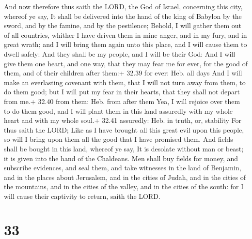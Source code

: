  And now therefore thus saith the LORD, the God of
Israel, concerning this city, whereof ye say, It shall be delivered into
the hand of the king of Babylon by the sword, and by the famine, and by
the pestilence;  Behold, I will gather them out of all
countries, whither I have driven them in mine anger, and in my fury, and
in great wrath; and I will bring them again unto this place, and I will
cause them to dwell safely:  And they shall be my people,
and I will be their God:  And I will give them one heart,
and one way, that they may fear me for ever, for the good of them, and
of their children after them:+ 32.39 for ever: Heb. all days
 And I will make an everlasting covenant with them, that I
will not turn away from them, to do them good; but I will put my fear in
their hearts, that they shall not depart from me.+ 32.40 from them: Heb.
from after them  Yea, I will rejoice over them to do them
good, and I will plant them in this land assuredly with my whole heart
and with my whole soul.+ 32.41 assuredly: Heb. in truth, or, stability
 For thus saith the LORD; Like as I have brought all this
great evil upon this people, so will I bring upon them all the good that
I have promised them.  And fields shall be bought in this
land, whereof ye say, It is desolate without man or beast; it is given
into the hand of the Chaldeans.  Men shall buy fields for
money, and subscribe evidences, and seal them, and take witnesses in the
land of Benjamin, and in the places about Jerusalem, and in the cities
of Judah, and in the cities of the mountains, and in the cities of the
valley, and in the cities of the south: for I will cause their captivity
to return, saith the LORD.

\hypertarget{section-32}{%
\section{33}\label{section-32}}

